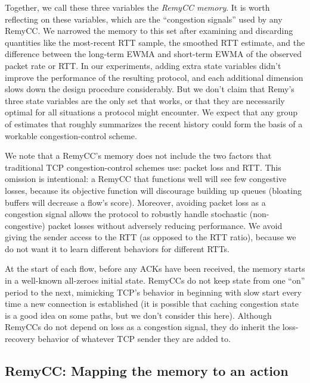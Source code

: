 Together, we call these three variables the {\em RemyCC memory}. It is
worth reflecting on these variables, which are the
``congestion signals'' used by any RemyCC. We narrowed the memory to
this set after examining and discarding quantities like the
most-recent RTT sample, the smoothed RTT estimate, and the difference
between the long-term EWMA and short-term EWMA of the observed packet
rate or RTT. In our experiments, adding extra state variables didn't improve
the performance of the resulting protocol, and each additional
dimension slows down the design procedure considerably. But we don't
claim that Remy's three state variables are the only set that works,
or that they are necessarily optimal for all situations a protocol
might encounter. We expect that any group of estimates that roughly
summarizes the recent history could form the basis of a workable
congestion-control scheme.

We note that a RemyCC's memory does not include the two
factors that traditional TCP congestion-control schemes use: packet
loss and RTT. This omission is intentional: a RemyCC that functions
well will see few congestive losses, because its objective function
will discourage building up queues (bloating buffers will decrease a
flow's score).  Moreover, avoiding packet loss as a congestion signal
allows the protocol to robustly handle stochastic (non-congestive)
packet losses without adversely reducing performance. We
avoid giving the sender access to the RTT (as opposed to the RTT
ratio), because we do not want it to learn different behaviors for
different RTTs.


At the start of each flow, before any ACKs have been received, the
memory starts in a well-known all-zeroes initial state. RemyCCs do not
keep state from one ``on'' period to the next, mimicking TCP's
behavior in beginning with slow start every time a new connection is
established (it is possible that caching congestion state is a good
idea on some paths, but we don't consider this here). Although RemyCCs
do not depend on loss as a congestion signal, they do inherit the
loss-recovery behavior of whatever TCP sender they are added to.

\subsection{RemyCC: Mapping the memory to an action}

